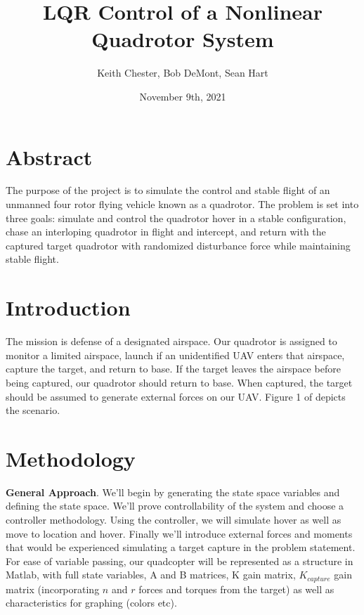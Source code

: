 \documentclass{article}
\title{LQR Control of a Nonlinear Quadrotor System}
\author{Keith Chester, Bob DeMont, Sean Hart}
\date{November 9th, 2021}
\begin{document}
\maketitle


\begin{multicols}{2}
\section*{Abstract}
The purpose of the project is to simulate the control and stable flight of an unmanned four rotor flying vehicle known as a quadrotor.  The problem is set into three goals: simulate and control the quadrotor hover in a stable configuration, chase an interloping quadrotor in flight and intercept, and return with the captured target quadrotor with randomized disturbance force while maintaining stable flight.

\section*{Introduction}
The mission is defense of a designated airspace.  Our quadrotor is assigned to monitor a limited airspace, launch if an unidentified 
UAV enters that airspace, capture the target, and return to base.  If the target leaves the airspace before being captured, our 
quadrotor should return to base.  When captured, the target should be assumed to generate external forces on our UAV.  Figure 1 of \cite{FaalP} depicts the scenario.
\section*{Methodology}
\textbf{General Approach}. We'll begin by generating the state space variables and defining the state space.  We'll prove 
controllability of the system and choose a controller methodology.  Using the controller, we will simulate hover as well as move to 
location and hover.  Finally we'll introduce external forces and moments that would be experienced simulating a target capture in the 
problem statement.  For ease of variable passing, our quadcopter will be represented as a structure in Matlab, with full state 
variables, A and B matrices, K gain matrix, $K_{capture}$ gain matrix (incorporating $n$ and $r$ forces and torques from the target) 
as well as characteristics for graphing (colors etc).


\end{multicols}
\end{document}
